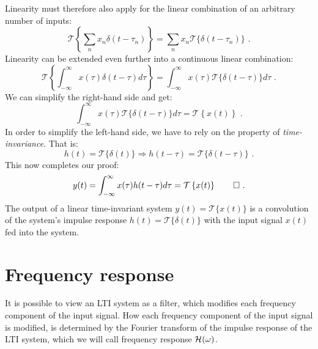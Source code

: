Linearity must therefore also apply for the linear combination of an arbitrary number of inputs:
\begin{equation}
\mathcal{T}\left\{\sum_n x_n \delta(t-\tau_n)\right\} = \sum_n x_n \mathcal{T}\{\delta(t-\tau_n)\}\,\,.
\end{equation}
Linearity can be extended even further into a continuous linear combination:
\begin{equation}
\mathcal{T}\left\{\int_{-\infty}^{\infty} x(\tau)\delta(t-\tau)d\tau\right\} = \int_{-\infty}^{\infty} x(\tau) \mathcal{T}\{\delta(t-\tau)\} d\tau\,\,.
\end{equation}
We can simplify the right-hand side and get:
\begin{equation}
\int_{-\infty}^{\infty} x(\tau) \mathcal{T}\{\delta(t-\tau)\} d\tau = \mathcal{T}\left\{x(t)\right\}\,\,.
\end{equation}
In order to simplify the left-hand side, we have to rely on the property of \emph{time-invariance}. That is:
\begin{equation}
h(t) = \mathcal{T}\{\delta(t)\} \Rightarrow h(t-\tau) = \mathcal{T}\{\delta(t-\tau)\}\,\,.
\end{equation}
This now completes our proof:
\begin{equation}
y(t)=\int_{-\infty}^{\infty} x(\tau) h(t-\tau) d\tau = \mathcal{T}\left\{x(t)\right\}\qed\,\,.
\end{equation}
The output of a linear time-invariant system $y(t)=\mathcal{T}\{x(t)\}$ is a convolution of the system's impulse response $h(t)=\mathcal{T}\{\delta(t)\}$ with the input signal $x(t)$ fed into the system.

\section{Frequency response}
It is possible to view an LTI system as a filter, which modifies each frequency component of the input signal. How each frequency component of the input signal is modified, is determined by the Fourier transform of the impulse response of the LTI system, which we will call  frequency response $\mathcal{H}(\omega)$.

